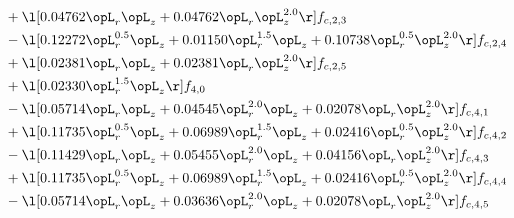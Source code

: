 \begin{alignat}{2}
& + \l[  0.04762 \opL_r \opL_z +  0.04762 \opL_r \opL_z^{2.0}  \r] f_{c,2,3} \nonumber \\ 
& - \l[  0.12272 \opL_r^{0.5} \opL_z +  0.01150 \opL_r^{1.5} \opL_z +  0.10738 \opL_r^{0.5} \opL_z^{2.0}  \r] f_{c,2,4} \nonumber \\ 
& + \l[  0.02381 \opL_r \opL_z +  0.02381 \opL_r \opL_z^{2.0}  \r] f_{c,2,5} \nonumber \\ 
& + \l[  0.02330 \opL_r^{1.5} \opL_z  \r] f_{4,0} \nonumber \\ 
& - \l[  0.05714 \opL_r \opL_z +  0.04545 \opL_r^{2.0} \opL_z +  0.02078 \opL_r \opL_z^{2.0}  \r] f_{c,4,1} \nonumber \\ 
& + \l[  0.11735 \opL_r^{0.5} \opL_z +  0.06989 \opL_r^{1.5} \opL_z +  0.02416 \opL_r^{0.5} \opL_z^{2.0}  \r] f_{c,4,2} \nonumber \\ 
& - \l[  0.11429 \opL_r \opL_z +  0.05455 \opL_r^{2.0} \opL_z +  0.04156 \opL_r \opL_z^{2.0}  \r] f_{c,4,3} \nonumber \\ 
& + \l[  0.11735 \opL_r^{0.5} \opL_z +  0.06989 \opL_r^{1.5} \opL_z +  0.02416 \opL_r^{0.5} \opL_z^{2.0}  \r] f_{c,4,4} \nonumber \\ 
& - \l[  0.05714 \opL_r \opL_z +  0.03636 \opL_r^{2.0} \opL_z +  0.02078 \opL_r \opL_z^{2.0}  \r] f_{c,4,5} \nonumber \\ 
\end{alignat} 


